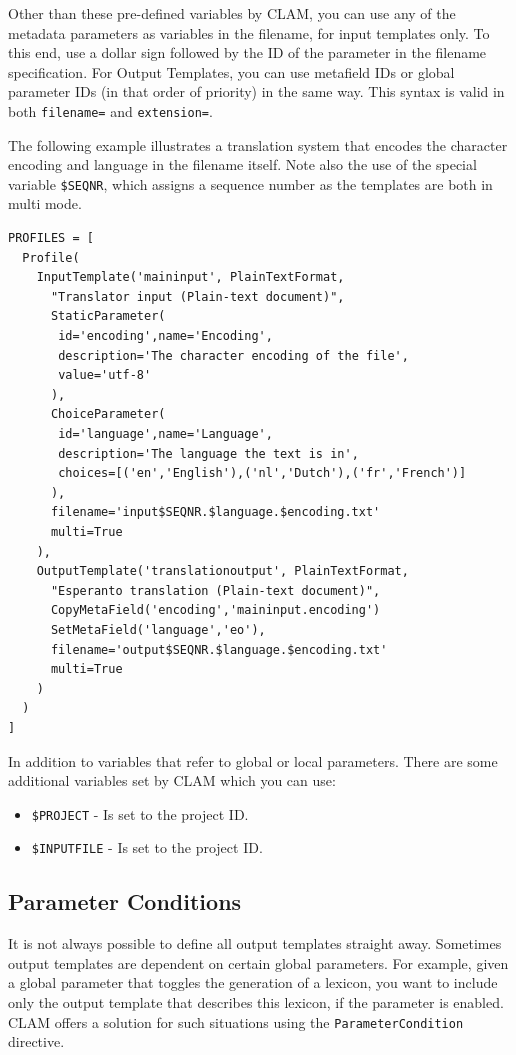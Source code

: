 \documentclass[a4paper,12pt,twoside,openright]{report}
\begin{document}
Other than these pre-defined variables by CLAM, you can use
any of the metadata parameters as variables in the filename, for input
templates only. To this end, use a
dollar sign followed by the ID of the parameter in the filename specification.
For Output Templates, you can use metafield IDs or global parameter IDs (in
that order of priority) in the same way. This syntax is valid in both
\texttt{filename=} and \texttt{extension=}.

The following example illustrates a translation system that encodes the
character encoding and language in the filename itself. Note also the use of
the special variable \texttt{\$SEQNR}, which assigns a sequence number as the
templates are both in multi mode.

{\small
\begin{verbatim}
PROFILES = [ 
  Profile( 
    InputTemplate('maininput', PlainTextFormat,
      "Translator input (Plain-text document)",  
      StaticParameter(
       id='encoding',name='Encoding',
       description='The character encoding of the file', 
       value='utf-8'
      ),  
      ChoiceParameter(
       id='language',name='Language',
       description='The language the text is in', 
       choices=[('en','English'),('nl','Dutch'),('fr','French')]
      ),
      filename='input$SEQNR.$language.$encoding.txt'
      multi=True
    ), 
    OutputTemplate('translationoutput', PlainTextFormat,
      "Esperanto translation (Plain-text document)",  
      CopyMetaField('encoding','maininput.encoding')
      SetMetaField('language','eo'),
      filename='output$SEQNR.$language.$encoding.txt'
      multi=True
    )    
  )
]
\end{verbatim}
}

In addition to variables that refer to global or local parameters. There are some additional variables set by CLAM which you can use:

\begin{itemize}
\item \texttt{\$PROJECT} - Is set to the project ID.
\item \texttt{\$INPUTFILE} - Is set to the project ID.
\end{itemize}



\subsection{Parameter Conditions}
\label{sec:paramcond}

It is not always possible to define all output templates straight away.
Sometimes output templates are dependent on certain global parameters. For
example, given a global parameter that toggles the generation of a lexicon, you
want to include only the output template that describes this lexicon, if the
parameter is enabled. CLAM offers a solution for such situations using the
\texttt{ParameterCondition} directive.
\end{document}
